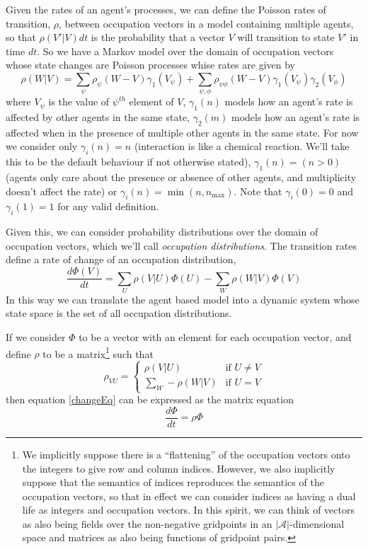 \documentclass[a4paper]{article}
\begin{document}
Given the rates of an agent's processes, we can define the Poisson rates of transition, $\rho$, between occupation vectors in a model containing multiple agents, so that $\rho(V'|V)dt$ is the probability that a vector $V$ will transition to state $V'$ in time $dt$. So we have a Markov model over the domain of occupation vectors whose state changes are Poisson processes whise rates are given by 
\begin{equation}
\rho(W|V) = \sum_{\psi}  \rho_\psi(W-V) \gamma_1(V_\psi) + \sum_{\psi,\phi}  \rho_{\psi\phi}(W-V) \gamma_1(V_\psi)\gamma_2(V_\phi)
\label{rateEq}
\end{equation}
where $V_\psi$ is the value of $\psi^{th}$ element of $V$, $\gamma_1(n)$ models how an agent's rate is affected by other agents in the same state, $\gamma_2(m)$ models how an agent's rate is affected when in the presence of multiple other agents in the same state. For now we consider only $\gamma_i(n) = n$ (interaction is like a chemical reaction. We'll take this to be the default behaviour if not otherwise stated), $\gamma_1(n) = (n>0)$ (agents only care about the presence or absence of other agents, and multiplicity doesn't affect the rate) or $\gamma_i(n) = \min(n,n_{\text{max}})$. Note that $\gamma_i(0) = 0$ and $\gamma_i(1) = 1$ for any valid definition.

Given this, we can consider probability distributions over the domain of occupation vectors, which we'll call \textit{occupation distributions}. The transition rates define a rate of change of an occupation distribution,
\begin{equation}
\frac{d\Phi(V)}{dt} = \sum_{U} \rho(V|U)\Phi(U) - \sum_W \rho(W|V)\Phi(V)
\label{changeEq}
\end{equation}
In this way we can translate the agent based model into a dynamic system whose state space is the set of all occupation distributions.

If we consider $\Phi$ to be a vector with an element for each occupation vector, and define $\rho$ to be a matrix\footnote{We implicitly suppose there is a ``flattening'' of the occupation vectors onto the integers to give row and column indices. However, we also implicitly suppose that the semantics of indices reproduces the semantics of the occupation vectors, so that in effect we can consider indices as having a dual life as integers and occupation vectors. In this spirit, we can think of vectors as also being fields over the non-negative gridpoints in an $|\mathcal{A}|$-dimensional space and matrices as also being functions of gridpoint pairs.} such that
\begin{equation}
\rho_{VU} = 
\begin{cases}
	\rho(V|U) & \text{if } U \ne V\\
	\sum_{W} -\rho(W|V) & \text{if } U = V
\end{cases}
\label{rhoMatrixEq}
\end{equation}
then equation \ref{changeEq} can be expressed as the matrix equation
\begin{equation}
	\frac{d\Phi}{dt} = \rho\Phi
	\label{expChangeEq}
\end{equation}
\end{document}

